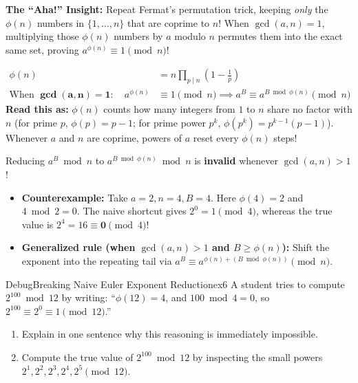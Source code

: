 \documentclass[11pt,a4paper]{article}
\theoremstyle{definition}
\newcommand{\ahabeat}{\textbf{\color{accentteal}The ``Aha!'' Insight:} }
\begin{document}
\ahabeat Repeat Fermat's permutation trick, keeping \emph{only} the $\phi(n)$ numbers in $\{1, \dots, n\}$ that are coprime to $n$! When $\gcd(a, n) = 1$, multiplying those $\phi(n)$ numbers by $a$ modulo $n$ permutes them into the exact same set, proving $a^{\phi(n)} \equiv 1 \pmod n$!

\begin{formulabox}
\[
\begin{aligned}
    \phi(n) &= n \prod_{p \mid n} \left(1 - \frac{1}{p}\right) \\
    \text{When } \mathbf{\gcd(a, n) = 1}:\quad a^{\phi(n)} &\equiv 1 \pmod n \implies a^B \equiv a^{B \bmod \phi(n)} \pmod n
\end{aligned}
\]
\textbf{Read this as:} $\phi(n)$ counts how many integers from $1$ to $n$ share no factor with $n$ (for prime $p$, $\phi(p) = p - 1$; for prime power $p^k$, $\phi(p^k) = p^{k-1}(p - 1)$). Whenever $a$ and $n$ are coprime, powers of $a$ reset every $\phi(n)$ steps!
\end{formulabox}

\begin{watchoutbox}[Watch Out --- Exponent Reduction Strictly Requires $\gcd(a, n) = 1$!]
Reducing $a^B \bmod n$ to $a^{B \bmod \phi(n)} \bmod n$ is \textbf{invalid} whenever $\gcd(a, n) > 1$!
\begin{itemize}
    \item \textbf{Counterexample:} Take $a = 2, n = 4, B = 4$. Here $\phi(4) = 2$ and $4 \bmod 2 = 0$. The naive shortcut gives $2^0 = 1 \pmod 4$, whereas the true value is $2^4 = 16 \equiv \mathbf{0} \pmod 4$!
    \item \textbf{Generalized rule (when $\gcd(a, n) > 1$ and $B \ge \phi(n)$):} Shift the exponent into the repeating tail via $a^B \equiv a^{\phi(n) + (B \bmod \phi(n))} \pmod n$.
\end{itemize}
\end{watchoutbox}

\begin{tryitbox}{Debug}{Breaking Naive Euler Exponent Reduction}{ex6}
A student tries to compute $2^{100} \bmod 12$ by writing:
``$\phi(12) = 4$, and $100 \bmod 4 = 0$, so $2^{100} \equiv 2^0 \equiv 1 \pmod{12}$.''
\begin{enumerate}
    \item Explain in one sentence why this reasoning is immediately impossible.
    \item Compute the true value of $2^{100} \bmod 12$ by inspecting the small powers $2^1, 2^2, 2^3, 2^4, 2^5 \pmod{12}$.
\end{enumerate}
\end{tryitbox}
\end{document}
